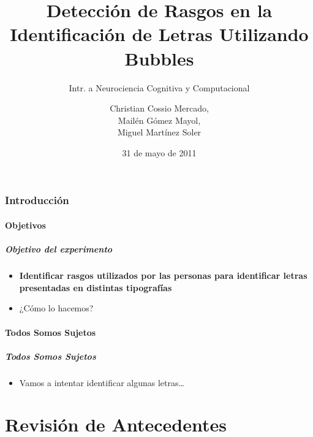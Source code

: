 \documentclass[10pt]{beamer}
\title[Identificaci\'on de Letras Utilizando Bubbles]{Detecci\'on de Rasgos en la Identificaci\'on de Letras Utilizando Bubbles}
\subtitle{Intr. a Neurociencia Cognitiva y Computacional}
\author[Miguel, Mail\'en, Christian]{Christian Cossio Mercado,\\Mail\'en G\'omez Mayol,\\Miguel Mart\'inez Soler}
\institute[FCEyN,UBA]{Departamento de Computaci\'on - FCEyN, UBA}
\date{31 de mayo de 2011}
\begin{document}
\begin{frame}%
\titlepage
\end{frame}

\section{Introducci\'on}
  \subsection{Objetivos}
      \begin{frame}
	\frametitle{Objetivo del experimento}
	\begin{itemize}
		\item \textbf{Identificar rasgos utilizados por las personas para identificar letras presentadas en distintas tipograf\'ias}\pause
		\item \alert{¿Cómo lo hacemos?}
	\end{itemize}
      \end{frame}

  \subsection{Todos Somos Sujetos}
      \begin{frame}
	\frametitle{Todos Somos Sujetos}
	\begin{itemize}
		\item Vamos a intentar identificar algunas letras\ldots
	\end{itemize}
      \end{frame}

\part[Antecedentes]{Revisi\'on de Antecedentes}
\frame{\partpage}
\end{document}
